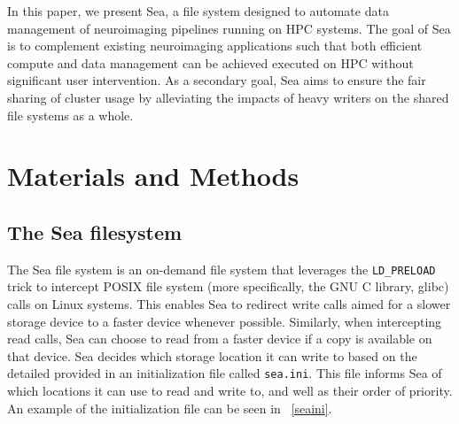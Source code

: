    In this paper, we present Sea, a file system designed to automate data
    management of neuroimaging pipelines running on HPC systems. The goal of Sea
    is to complement existing neuroimaging applications such that both efficient
    compute and data management can be achieved executed on HPC without
    significant user intervention. As a secondary goal, Sea aims to ensure the
    fair sharing of cluster usage by alleviating the impacts of heavy writers on
    the shared file systems as a whole. 
    
    
    
    
    
    
    \section{Materials and Methods}
    
    \subsection{The Sea filesystem}
    
    The Sea file system is an on-demand file system that leverages the \texttt{LD\_PRELOAD} trick to intercept POSIX file system (more specifically, the GNU C library, glibc)
    calls on Linux systems. This enables Sea to redirect write calls aimed for a slower storage device to a faster device whenever
    possible. Similarly, when intercepting read calls, Sea can choose to read from a faster device if a copy is available on that device.
    Sea decides which storage location it can write to based on the detailed provided in an initialization file called \texttt{sea.ini}. 
    This file informs Sea of which locations it can use to read and write to, and well as their order of priority. An example of the initialization
    file can be seen in ~\ref{seaini}.
    
